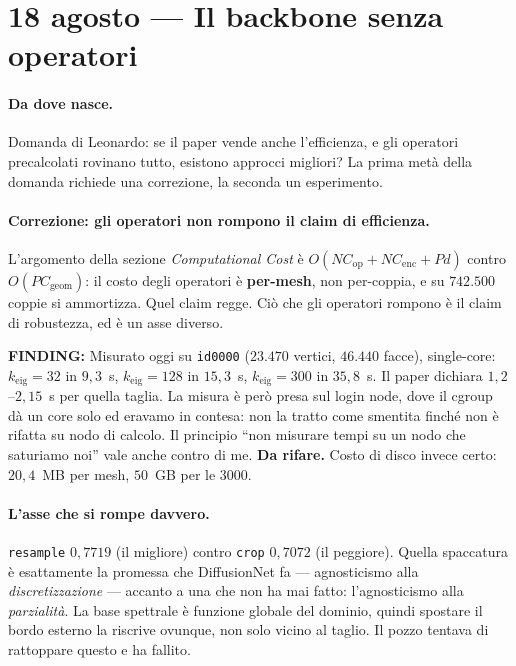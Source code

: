 \documentclass[11pt,a4paper]{article}
\newcommand{\finding}[1]{\textcolor{finding}{\textbf{FINDING:}} #1}
\begin{document}
\section{18 agosto --- Il backbone senza operatori}

\paragraph{Da dove nasce.} Domanda di Leonardo: se il paper vende anche l'efficienza, e gli
operatori precalcolati rovinano tutto, esistono approcci migliori? La prima met\`a della domanda
richiede una correzione, la seconda un esperimento.

\paragraph{Correzione: gli operatori non rompono il claim di efficienza.} L'argomento della
sezione \emph{Computational Cost} \`e $O(N C_{\mathrm{op}} + N C_{\mathrm{enc}} + P d)$ contro
$O(P C_{\mathrm{geom}})$: il costo degli operatori \`e \textbf{per-mesh}, non per-coppia, e su
$742{.}500$ coppie si ammortizza. Quel claim regge. Ci\`o che gli operatori rompono \`e il claim
di robustezza, ed \`e un asse diverso.

\finding{Misurato oggi su \texttt{id0000} ($23{.}470$ vertici, $46{.}440$ facce), single-core:
$k_{\mathrm{eig}}=32$ in $9{,}3$~s, $k_{\mathrm{eig}}=128$ in $15{,}3$~s, $k_{\mathrm{eig}}=300$
in $35{,}8$~s. Il paper dichiara $1{,}2$--$2{,}15$~s per quella taglia. La misura \`e per\`o
presa sul login node, dove il cgroup d\`a un core solo ed eravamo in contesa: non la tratto come
smentita finch\'e non \`e rifatta su nodo di calcolo. Il principio ``non misurare tempi su un
nodo che saturiamo noi'' vale anche contro di me. \textbf{Da rifare.} Costo di disco invece
certo: $20{,}4$~MB per mesh, $50$~GB per le $3000$.}

\paragraph{L'asse che si rompe davvero.} \texttt{resample} $0{,}7719$ (il migliore) contro
\texttt{crop} $0{,}7072$ (il peggiore). Quella spaccatura \`e esattamente la promessa che
DiffusionNet fa --- agnosticismo alla \emph{discretizzazione} --- accanto a una che non ha mai
fatto: l'agnosticismo alla \emph{parzialit\`a}. La base spettrale \`e funzione globale del
dominio, quindi spostare il bordo esterno la riscrive ovunque, non solo vicino al taglio. Il
pozzo tentava di rattoppare questo e ha fallito.
\end{document}
